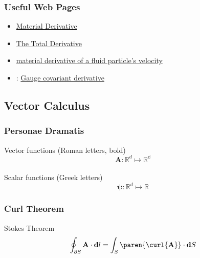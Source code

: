 %
\begin{frame}\frametitle{Useful Web Pages}
\begin{itemize}
	\item {} \href{https://www.continuummechanics.org/materialderivative.html}{Material Derivative}
	\item {} \href{http://www.fluiddynamics.it/capitoli/Tota.pdf}{The Total Derivative}
	\item {} \href{https://physics.stackexchange.com/questions/368399/about-the-material-derivative-of-a-fluid-particles-velocity}{material derivative of a fluid particle's velocity}
	\item {}: \href{https://en.wikipedia.org/wiki/Gauge_covariant_derivative}{Gauge covariant derivative}
\end{itemize}
\end{frame}
%

\subsection{Vector Calculus}
%
\begin{frame}\frametitle{Personae Dramatis}
\center
Vector functions (Roman letters, bold)
\begin{equation}
	\mathbf{A}\colon \mathbb{R}^{d} \mapsto \mathbb{R^{d}}
\label{eq:Avector}
\end{equation}
\ \\[10 pt]
Scalar functions (Greek letters)
\begin{equation}
	\mathbf{\psi}\colon \mathbb{R}^{d} \mapsto \mathbb{R}
\label{eq:Avector}
\end{equation}
\end{frame}
%
%
\begin{frame}\frametitle{Curl Theorem}
\center
Stokes Theorem
\begin{equation}
	\oint_{\partial S} \mathbf{A}\cdot \mathbf{d}l = \int_{S} \paren{ \curl{\mathbf{A}}}  \cdot \mathbf{d}S
\label{eq:curl-theorem}
\end{equation}

\end{frame}


\endinput  %
